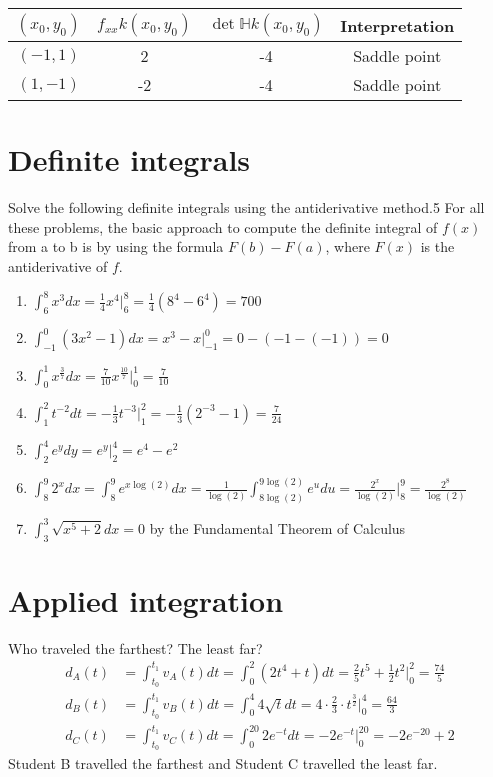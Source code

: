 \documentclass[12pt]{article}
\begin{document}
\begin{enumerate}
\begin{center}
\begin{tabular}{ c |c |c |c }
 $(x_0,y_0)$ & $f_{xx} k(x_0,y_0)$ & $\det \mathbb{H}k(x_0,y_0)$ & Interpretation
 \\  \hline \hline
 $(-1,1)$ &  2 &-4 & Saddle point\\  
 $(1,-1) $&  -2 & -4 & Saddle point
 \end{tabular}
\end{center}
\end{enumerate}

\section{Definite integrals}
Solve the following definite integrals using the antiderivative method.5
For all these problems, the basic approach to compute the definite integral of $f(x)$ from a to b is by using the
formula $F(b) - F(a)$, where $F(x)$ is the antiderivative of $f$.
\begin{enumerate}
    \item $\int_6^8 x^3 dx = \frac{1}{4}x^4 \bigg|_6^8  = \frac{1}{4}(8^4-6^4)=700$
    \item $\int_{-1}^0 (3x^2 -1) dx = x^3 -x \bigg|_{-1}^0= 0-(-1-(-1))=0$
    \item $\int_0^1 x^{\frac{3}{7}}dx = \frac{7}{10} x^{\frac{10}{7}} \bigg|_0^1 = \frac{7}{10}$
    \item $\int_1^2 t^{-2}dt = -\frac{1}{3}t^{-3} \bigg|_1^2 = -\frac{1}{3}(2^{-3} -1) = \frac{7}{24}$
    \item $\int_2^4 e^y dy = e^y \bigg|_2^4 = e^4-e^2$
    \item $\int_8^9 2^x dx = \int_8^9 e^{x\log(2)} dx= \frac{1}{\log(2)}\int_{8\log(2)}^{9\log(2)}e^udu = \frac{2^x}{\log(2)}\bigg|_8^9 = \frac{2^8}{\log(2)}$
    \item $\int_3^3 \sqrt{x^5+2} dx=0$ by the Fundamental Theorem of Calculus
\end{enumerate}

\section{Applied integration}
Who traveled the farthest? The least far? 
\begin{align*}
    d_A(t) &= \int_{t_0}^{t_1} v_A(t) dt = \int_0^2 (2t^4+t)dt = \frac{2}{5}t^5 + \frac{1}{2}t^2 \bigg|_0^2 = \frac{74}{5}
    \\ d_B(t) &= \int_{t_0}^{t_1} v_B(t) dt = \int_0^4 4\sqrt{t}dt = 4\cdot \frac{2}{3} \cdot t^{\frac{3}{2}}\bigg|_0^4 = \frac{64}{3}
    \\  d_C(t) &= \int_{t_0}^{t_1} v_C(t) dt = \int_0^{20}2e^{-t}dt = -2e^{-t}\bigg|_0^{20} =  -2e^{-20}+2
\end{align*}
Student B travelled the farthest and Student C travelled the least far. 
\end{document}
